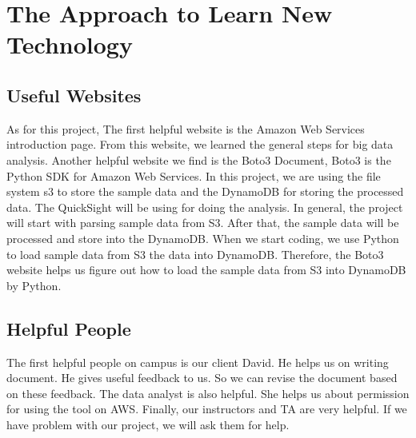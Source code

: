 \section{The Approach to Learn New Technology}
	\subsection{Useful Websites}
    \noindent As for this project, The first helpful website is the Amazon Web Services introduction page. From this website, we learned the general steps for big data analysis. Another helpful website we find is the Boto3 Document, Boto3 is the Python SDK for Amazon Web Services. In this project, we are using the file system s3 to store the sample data and the DynamoDB for storing the processed data. The QuickSight will be using for doing the analysis. In general, the project will start with parsing sample data from S3. After that, the sample data will be processed and store into the DynamoDB. When we start coding, we use Python to load sample data from S3 the data into DynamoDB. Therefore, the Boto3 website helps us figure out how to load the sample data from S3 into DynamoDB by Python. 
    
    \subsection{Helpful People}
    \noindent The first helpful people on campus is our client David. He helps us on writing document. He gives useful feedback to us. So we can revise the document based on these feedback. The data analyst is also helpful. She helps us about permission for using the tool on AWS. Finally, our instructors and TA are very helpful. If we have problem with our project, we will ask them for help.
